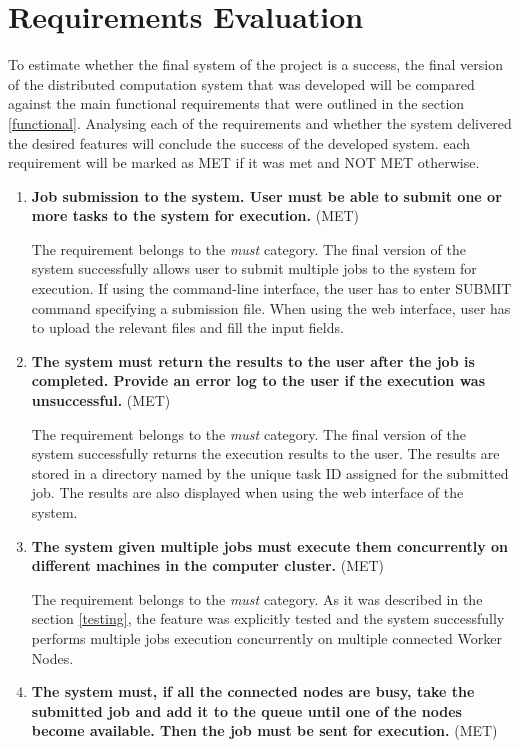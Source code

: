 \documentclass[10pt]{report}
\begin{document}
\section{Requirements Evaluation} \label{evaluation}

To estimate whether the final system of the project is a success, the final version of the distributed computation system that was developed will be compared against the main functional requirements that were outlined in the section \ref{functional}. Analysing each of the requirements and whether the system delivered the desired features will conclude the success of the developed system. each requirement will be marked as MET if it was met and NOT MET otherwise.

\begin{enumerate}
    \item \textbf{Job submission to the system. User must be able to submit one or more tasks to the system for execution.} (MET)

    The requirement belongs to the \textit{must} category. The final version of the system successfully allows user to submit multiple jobs to the system for execution. If using the command-line interface, the user has to enter SUBMIT command specifying a submission file. When using the web interface, user has to upload the relevant files and fill the input fields.

    \item \textbf{The system must return the results to the user after the job is completed. Provide an error log to the user if the execution was unsuccessful.} (MET)

    The requirement belongs to the \textit{must} category. The final version of the system successfully returns the execution results to the user. The results are stored in a directory named by the unique task ID assigned for the submitted job. The results are also displayed when using the web interface of the system.

    \item \textbf{The system given multiple jobs must execute them concurrently on different machines in the computer cluster.} (MET)

    The requirement belongs to the \textit{must} category. As it was described in the section \ref{testing}, the feature was explicitly tested and the system successfully performs multiple jobs execution concurrently on multiple connected Worker Nodes.

    \item \textbf{The system must, if all the connected nodes are busy, take the submitted job and add it to the queue until one of the nodes become available. Then the job must be sent for execution.} (MET)


\end{enumerate}
\end{document}
